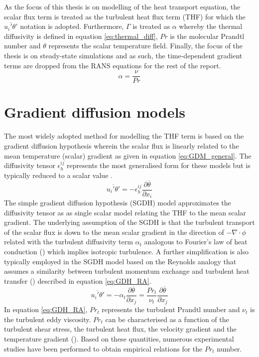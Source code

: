 As the focus of this thesis is on modelling of the heat transport equation, the scalar flux term is treated as the turbulent heat flux term (THF) for which the $\overline{u_{i}'\theta'}$ notation is adopted. Furthermore, $\Gamma$ is treated as $\alpha$ whereby the thermal diffusivity is defined in equation \ref{eq:thermal_diff}, $Pr$ is the molecular Prandtl number and $\theta$ represents the scalar temperature field. Finally, the focus of the thesis is on steady-state simulations and as such, the time-dependent gradient terms are dropped from the RANS equations for the rest of the report. 
\begin{equation}
\label{eq:thermal_diff}
\alpha = \frac{\nu}{Pr}
\end{equation}
\section{Gradient diffusion models}
The most widely adopted method for modelling the THF term is based on the gradient diffusion hypothesis wherein the scalar flux is linearly related to the mean temperature (scalar) gradient as given in equation \ref{eq:GDM_general}. The diffusivity tensor $\epsilon^{ij}_{h}$ represents the most generalised form for these models but is typically reduced to a scalar value \cite{Grotzbach2013}.
\begin{equation}
\label{eq:GDM_general}
\overline{u_{i}'\theta'} = -\epsilon^{ij}_{h}\frac{\partial\overline{\theta}}{\partial x_{i}}
\end{equation}
The simple gradient diffusion hypothesis (SGDH) model approximates the diffusivity tensor as as single scalar model relating the THF to the mean scalar gradient. The underlying assumption of the SGDH is that the turbulent transport of the scalar flux is down to the mean scalar gradient in the direction of $-\nabla \cdot \phi$ related with the turbulent diffusivity term $\alpha_{t}$ analogous to Fourier's law of heat conduction (\cite{Pope2000}) which implies isotropic turbulence. A further simplification is also typically employed in the SGDH model based on the Reynolds analogy that assumes a similarity between turbulent momentum exchange and turbulent heat transfer (\cite{Bartosiewicz2019}) described in equation \ref{eq:GDH_RA}. 
\begin{equation}
\label{eq:GDH_RA}
\overline{u_{i}' \theta'} = -\alpha_{t} \frac{\partial \overline{\theta}}{\partial x_{j}} = \frac{Pr_{t}}{\nu_{t}}  \frac{\partial \overline{\theta}}{\partial x_{j}} 
\end{equation}
In equation \ref{eq:GDH_RA}, $Pr_{t}$ represents the turbulent Prandtl number and $\nu_{t}$ is the turbulent eddy viscosity. $Pr_{t}$ can be characterised as a function of the turbulent shear stress, the turbulent heat flux, the velocity gradient and the temperature gradient (\cite{Kays1994}). Based on these quantities, numerous experimental studies have been performed to obtain empirical relations for the $Pr_{t}$ number.

